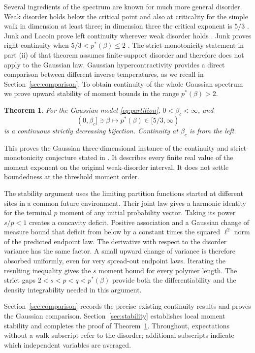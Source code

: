 \documentclass[11pt]{amsart}
\newcommand{\ps}{p^*}
\newtheorem{theorem}{Theorem}[section]
\theoremstyle{remark}
\numberwithin{equation}{section}
\begin{document}
Several ingredients of the spectrum are known for much more general
disorder. Weak disorder holds below the critical point and also at criticality
for the simple walk in dimension at least three; in dimension three the
critical exponent is $5/3$ \cite[Theorem~2.1 and Corollary~2.5]{Critical}.
Junk and Lacoin prove left continuity wherever weak disorder holds
\cite[Corollary~2.11(i)]{Tail}. Junk proves right continuity when
$5/3<\ps(\beta)\le2$ \cite[Theorem~1.2(i)]{Junk}. The strict-monotonicity
statement in part (ii) of that theorem assumes finite-support disorder and
therefore does not apply to the Gaussian law. Gaussian hypercontractivity
provides a direct comparison between different inverse temperatures, as we
recall in Section~\ref{sec:comparison}. To obtain continuity of the whole
Gaussian spectrum we prove upward stability of moment bounds in the range
$\ps(\beta)>2$.

\begin{theorem}\label{thm:main}
For the Gaussian model \eqref{eq:partition}, $0<\beta_c<\infty$, and
\[
 (0,\beta_c]\ni\beta\longmapsto\ps(\beta)\in[5/3,\infty)
\]
is a continuous strictly decreasing bijection. Continuity at $\beta_c$ is
from the left.
\end{theorem}

This proves the Gaussian three-dimensional instance of the continuity and
strict-monotonicity conjecture stated in \cite[Conjecture~3.32]{Berger}.
It describes every finite real value of the moment exponent on the original
weak-disorder interval. It does not settle boundedness at the threshold
moment order.

The stability argument uses the limiting partition functions started at
different sites in a common future environment. Their joint law gives a
harmonic identity for the terminal $p$ moment of any initial probability
vector. Taking its power $s/p<1$ creates a concavity deficit. Positive
association and a Gaussian change of measure bound that deficit from below
by a constant times the squared $\ell^2$ norm of the predicted endpoint law.
The derivative with respect to the disorder variance has the same factor.
A small upward change of variance is therefore absorbed uniformly, even for
very spread-out endpoint laws. Iterating the resulting inequality gives the
$s$ moment bound for every polymer length. The strict gaps
$2<s<p<q<\ps(\beta)$ provide both the differentiability and the density
integrability needed in this argument.

Section~\ref{sec:comparison} records the precise existing continuity results
and proves the Gaussian comparison. Section~\ref{sec:stability} establishes
local moment stability and completes the proof of Theorem~\ref{thm:main}.
Throughout, expectations without a walk subscript refer to the disorder;
additional subscripts indicate which independent variables are averaged.
\end{document}
